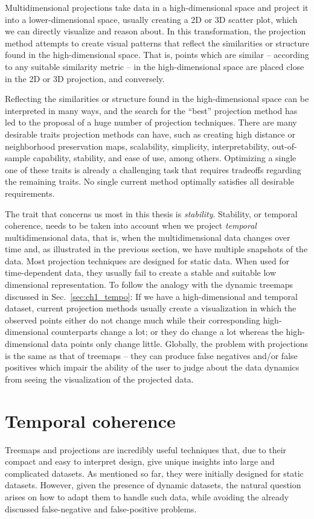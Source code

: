 Multidimensional projections take data in a high-dimensional space and project it into a lower-dimensional space, usually creating a 2D or 3D scatter plot, which we can directly visualize and reason about. In this transformation, the projection method attempts to create visual patterns that reflect the similarities or structure found in the high-dimensional space. That is, points which are similar -- according to any suitable similarity metric -- in the high-dimensional space are placed close in the 2D or 3D projection, and conversely.

Reflecting the similarities or structure found in the high-dimensional space can be interpreted in many ways, and the search for the ``best'' projection method has led to the proposal of a huge number of projection techniques.
There are many desirable traits projection methods can have, such as creating high distance or neighborhood preservation maps, scalability, simplicity, interpretability, out-of-sample capability, stability, and ease of use, among others. 
Optimizing a single one of these traits is already a challenging task that requires tradeoffs regarding the remaining traits. No single current method optimally satisfies all desirable requirements.

The trait that concerns us most in this thesis is \emph{stability}. Stability, or temporal coherence, needs to be taken into account when we project \emph{temporal} multidimensional data, that is, when the multidimensional data changes over time and, as illustrated in the previous section, we have multiple snapshots of the data. Most projection techniques are designed for static data. When used for time-dependent data, they usually fail to create a stable and suitable low dimensional representation. To follow the analogy with the dynamic treemaps discussed in Sec.~\ref{sec:ch1_tempo}: If we have a high-dimensional and temporal dataset, current projection methods usually create a visualization in which the observed points either do not change much while their corresponding high-dimensional counterparts change a lot; or they do change a lot whereas the high-dimensional data points only change little. Globally, the problem with projections is the same as that of treemaps -- they can produce false negatives and/or false positives which impair the ability of the user to judge about the data dynamics from seeing the visualization of the projected data.

\section{Temporal coherence}
\label{sec:ch1_coherence}
%
Treemaps and projections are incredibly useful techniques that, due to their compact and easy to interpret design, give unique insights into large and complicated datasets.
As mentioned so far, they were initially designed for static datasets. However, given the presence of dynamic datasets, the natural question arises on how to adapt them to handle such data, while avoiding the already discussed false-negative and false-positive problems. 

